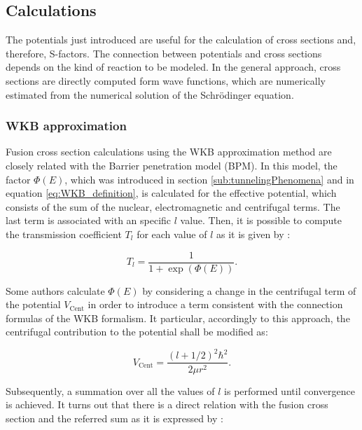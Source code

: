 \documentclass[openany]{book}
\begin{document}
\subsection{Calculations}  \label{sub:potential_calculations}

The potentials just introduced are useful for the calculation of cross sections and, therefore, S-factors. The connection between potentials and cross sections depends on the kind of reaction to be modeled. In the general approach, cross sections are directly computed form wave functions,  which are numerically estimated from the numerical solution of the Schrödinger equation. \\

\subsubsection{WKB approximation} \label{ssub:potential_calculations_WKB}

Fusion cross section calculations using the WKB approximation method are closely related with the Barrier penetration model (BPM). In this model,  the factor $\Phi(E)$, which was introduced in section \ref{sub:tunnelingPhenomena} and in equation \ref{eq:WKB_definition}, is calculated for the effective potential, which consists of the sum of the nuclear, electromagnetic and centrifugal terms. The last term is associated with an specific $l$ value. Then, it is possible to compute the transmission coefficient $T_l$ for each value of $l$ as it is given by \cite{koyuncu_soylu_2018}:

\begin{equation} \label{eq:potential_WKB_transmission}
	T_l =  \frac{1}{1 + \exp ({\Phi(E)} )}.
\end{equation}

Some authors calculate $\Phi(E)$ by considering a change in the centrifugal term of the potential $V_{\mathrm{Cent}}$ in order to introduce a term consistent with the connection formulas of the WKB formalism. It particular, accordingly to this approach, the centrifugal contribution to the potential shall be modified as: 

\begin{equation} \label{eq:potential_WKB_modified_centrifugal}
	V_{\mathrm{Cent}} = \frac{(l + 1/2)^2 \hbar^2}{2\mu r^2}.
\end{equation}

Subsequently, a summation over all the values of $l$ is performed until convergence is achieved. It turns out that there is a direct relation with the fusion cross section and the referred sum as it is expressed by \cite{koyuncu_soylu_2018, nobre_chamon_gasques_carlson_thompson_2007}:
\end{document}
